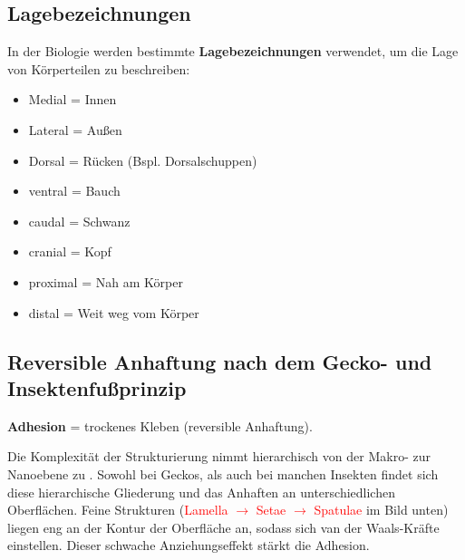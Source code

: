 \subsection{Lagebezeichnungen}
In der Biologie werden bestimmte \textbf{Lagebezeichnungen} verwendet, um die Lage von Körperteilen zu beschreiben:
\begin{itemize}
    \item Medial = Innen
    \item Lateral = Außen
    \item Dorsal = Rücken (Bspl. Dorsalschuppen)
    \item ventral = Bauch
    \item caudal = Schwanz
    \item cranial = Kopf
    \item proximal = Nah am Körper
    \item distal = Weit weg vom Körper
\end{itemize}

\subsection{Reversible Anhaftung nach dem Gecko- und Insektenfußprinzip}

\textbf{Adhesion} = trockenes Kleben (reversible Anhaftung).

Die Komplexität der Strukturierung nimmt hierarchisch von der Makro- zur Nanoebene zu \dangersign. Sowohl bei Geckos, als auch bei manchen Insekten findet sich diese hierarchische Gliederung und das Anhaften an unterschiedlichen Oberflächen. Feine Strukturen (\textcolor{red}{Lamella $\rightarrow$ Setae $\rightarrow$ Spatulae} im Bild unten) liegen eng an der Kontur der Oberfläche an, sodass sich van der Waals-Kräfte einstellen. Dieser schwache Anziehungseffekt stärkt die Adhesion.

